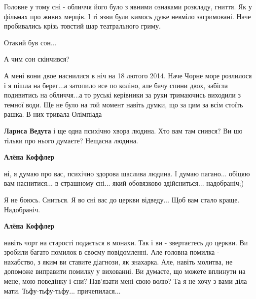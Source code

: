\begin{itemize}
Головне у тому сні - обличчя його було з явними ознаками розкладу, гниття. Як у
фільмах про живих мерців. І ті язви були кимось дуже невміло загримовані. Наче
пробивались крізь товстий шар театрального гриму.

Отакий був сон...

А чим сон скінчився?


А мені вони двое наснилися в ніч на 18 лютого 2014. Наче Чорне море розлилося
і я пішла на берег...а затопило все по коліно, але бачу спини двох, забігла
подивитись на обличчя...а то руські керівники за руки тримаючись виходили з
темної води. Ще не було на той момент навіть думки, що за цим за всім стоїть
рашка. В них тривала Олімпіада

\begin{itemize} %
\textbf{Лариса Ведута} і ще одна психічно хвора людина. Хто вам там снився? Ви шо тільки про нього думаєте? Нещасна людина.

\textbf{Алёна Коффлер} 

ні, я думаю про вас, психічно здорова щаслива людина. І думаю пагано... обіцяю
вам наснитися... в страшному сні... який обовязково здійсниться... надобраніч;)

Я не боюсь. Сниться. Я во сні вас до церкви відведу... Щоб вам стало краще. Надобраніч.

\textbf{Алёна Коффлер} 

навіть чорт на старості подається в монахи. Так і ви - звертаєтесь до церкви.
Ви зробили багато помилок в своєму повідомленні. Але головна помилка -
нахабство, з яким ви ставите діагнози, як знахарка. Але, навіть молитва, не
допоможе виправити помилку у вихованні. Ви думаєте, що можете вплинути на мене,
мою поведінку і сни? Нав'язати мені свою волю? Та я не хочу з вами діла мати.
Тьфу-тьфу-тьфу... причепилася...

\end{itemize} %



\end{itemize} %
